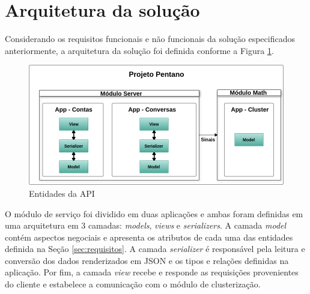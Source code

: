 \section{Arquitetura da solução}

Considerando os requisitos funcionais e não funcionais da solução especificados anteriormente, a arquitetura da solução foi definida 
conforme a Figura \ref{fig:arquitetura_api}.

\begin{figure}[h!]
\centering
\includegraphics[scale=0.5]{figuras/arquitetura_api.png}
\caption{Entidades da API}
\label{fig:arquitetura_api}
\end{figure}

O módulo de serviço foi dividido em duas aplicações e ambas foram definidas em uma arquitetura
em 3 camadas: \textit{models}, \textit{views} e \textit{serializers}. A camada \textit{model} contém
aspectos negociais e apresenta os atributos de cada uma das entidades definida na Seção \ref{sec:requisitos}.
A camada \textit{serializer} é responsável pela leitura e conversão dos dados renderizados em JSON e os tipos e relações
definidas na aplicação. Por fim, a camada \textit{view} recebe e responde as requisições provenientes do cliente e
estabelece a comunicação com o módulo de clusterização.




